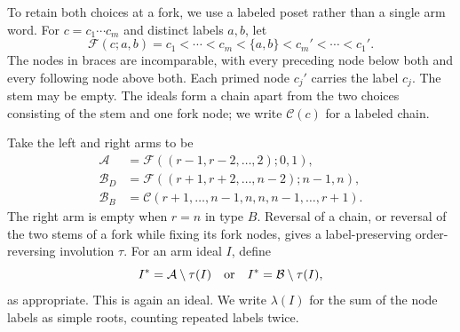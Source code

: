 \documentclass[11pt]{amsart}
\numberwithin{equation}{section}
\theoremstyle{definition}
\begin{document}
To retain both choices at a fork, we use a labeled poset rather than a single arm word. For $c=c_1\cdots c_m$ and distinct labels $a,b$, let
\[
 \mathcal F(c;a,b)
   =c_1<\cdots<c_m<\{a,b\}<c_m'<\cdots<c_1'.
\]
The nodes in braces are incomparable, with every preceding node below both and every following node above both. Each primed node $c_j'$ carries the label $c_j$. The stem may be empty. The ideals form a chain apart from the two choices consisting of the stem and one fork node; we write $\mathcal C(c)$ for a labeled chain.

Take the left and right arms to be
\begin{align}
 \mathcal A&=\mathcal F((r-1,r-2,\ldots,2);0,1),\label{eq:orth-left}\\
 \mathcal B_D&=\mathcal F((r+1,r+2,\ldots,n-2);n-1,n),\label{eq:orth-right-D}\\
 \mathcal B_B&=\mathcal C(r+1,\ldots,n-1,n,n,n-1,\ldots,r+1).
 \label{eq:orth-right-B}
\end{align}
The right arm is empty when $r=n$ in type $B$. Reversal of a chain, or reversal of the two stems of a fork while fixing its fork nodes, gives a label-preserving order-reversing involution $\tau$. For an arm ideal $I$, define
\[
 I^*=\mathcal A\setminus\tau(I)
 \quad\hbox{or}\quad I^*=\mathcal B\setminus\tau(I),
\]
as appropriate. This is again an ideal. We write $\lambda(I)$ for the sum of the node labels as simple roots, counting repeated labels twice.
\end{document}

